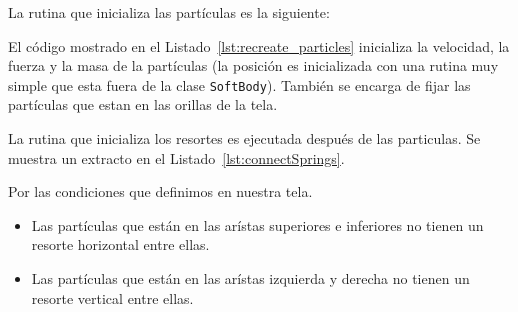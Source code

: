 La rutina que inicializa las partículas es la siguiente:


El código mostrado en el Listado~\ref{lst:recreate_particles} inicializa la velocidad, la fuerza y la masa de la partículas (la posición es inicializada con una rutina muy simple que esta fuera de la clase \texttt{SoftBody}). También se encarga de fijar las partículas que estan en las orillas de la tela.

La rutina que inicializa los resortes es ejecutada después de las particulas. Se muestra un extracto en el Listado~\ref{lst:connectSprings}.


Por las condiciones que definimos en nuestra tela. 
\begin{itemize}
 \item Las partículas que están en las arístas superiores e inferiores no tienen un resorte horizontal entre ellas.
 \item Las partículas que están en las arístas izquierda y derecha no tienen un resorte vertical entre ellas.
\end{itemize} 

